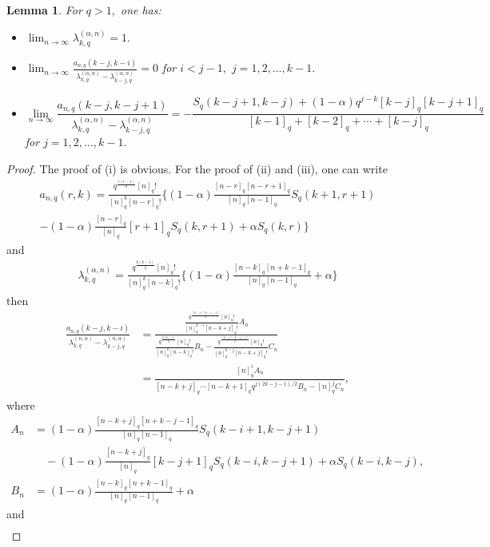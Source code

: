\documentclass[12pt]{article}
\numberwithin{equation}{section} \theoremstyle{plain}
\newtheorem{lemma}[theorem]{Lemma}
\theoremstyle{definition}
\theoremstyle{remark}
\begin{document}
\begin{lemma} \label{lemcn}
For $q>1,$ one has:
\begin{itemize}
\item [(i)] $\displaystyle \lim_{n\rightarrow\infty} \lambda_{k,q}^{(\alpha,n)}=1.$
\item [(ii)] 
$
\displaystyle \lim_{n\to \infty} \frac{a_{n,q}(k-j,k-i)}{\lambda_{k,q}^{(\alpha,n)}-\lambda_{k-j,q}^{(\alpha,n)}}=0
$
for $i<j-1,$ $j=1,2,\ldots,k-1.$
\item [(iii)] 
$$
\lim_{n\to \infty}\frac{a_{n,q}(k-j,k-j+1)}{\lambda_{k,q}^{(\alpha,n)}-\lambda_{k-j,q}^{(\alpha,n)}}
=-\frac{S_q(k-j+1,k-j)+(1-\alpha)q^{j-k}[k-j]_q[k-j+1]_q}{[k-1]_q+[k-2]_q+\cdots+[k-j]_q}
$$
for $j=1,2,\ldots,k-1.$
\end{itemize}
\end{lemma}
\begin{proof} The proof of (i) is obvious. For the proof of (ii) and (iii), one can write 
\begin{multline*}
a_{n,q}(r,k)=\frac{q^{\frac{r(r-1)}{2}}[n]_q!}{[n]_q^k[n-r]_q!}\bigg\{(1-\alpha)\frac{[n-r]_q[n-r+1]_q}{[n]_q[n-1]_q}S_q(k+1,r+1)\\
-(1-\alpha)\frac{[n-r]_q}{[n]_q}[r+1]_qS_q(k,r+1)+\alpha S_q(k,r)\bigg\}
\end{multline*}
and
\begin{eqnarray*}
\lambda_{k,q}^{(\alpha,n)}=\frac{q^{\frac{k(k-1)}{2}}[n]_q!}{[n]_q^k[n-k]_q!}\bigg\{(1-\alpha)\frac{[n-k]_q[n+k-1]_q}{[n]_q[n-1]_q}+\alpha\bigg\}
\end{eqnarray*}
then
\begin{align*}
\frac{a_{n,q}(k-j,k-i)}{\lambda_{k,q}^{(n,\alpha)}-\lambda_{k-j,q}^{(n,\alpha)}}&=\frac{\frac{q^{\frac{(k-j)(k-j-1)}{2}}[n]_q!}{[n]_q^{k-i}[n-k+j]_q!}A_n}{\frac{q^{\frac{k(k-1)}{2}}[n]_q!}{[n]_q^k[n-k]_q!}B_n-\frac{q^{\frac{(k-j)(k-j-1)}{2}}[n]_q!}{[n]_q^{k-j}[n-k+j]_q!}C_n}\nonumber\\
&=\frac{[n]_q^iA_n}{[n-k+j]_q\cdots[n-k+1]_qq^{j(2k-j-1)/2}B_n-[n]_q^jC_n},
\end{align*}
where
\begin{align*}
A_n&=(1-\alpha)\frac{[n-k+j]_q[n+k-j-1]_q}{[n]_q[n-1]_q}S_q(k-i+1,k-j+1)\\
&\quad-(1-\alpha)\frac{[n-k+j]_q}{[n]_q}[k-j+1]_qS_q(k-i,k-j+1)+\alpha S_q(k-i,k-j),\\
B_n&=(1-\alpha)\frac{[n-k]_q[n+k-1]_q}{[n]_q[n-1]_q}+\alpha
\end{align*}
and 
\begin{align*}

\end{align*}
\end{proof}
\end{document}
